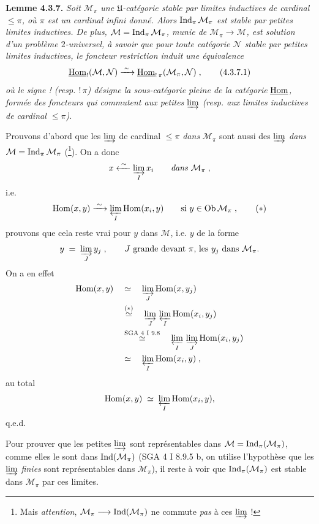 \textbf{Lemme 4.3.7.} \textit{Soit $\mathcal{M}_\pi$ une $\mathfrak{U}$-catégorie stable par limites inductives de cardinal $\leqslant \pi$, où $\pi$ est un cardinal infini donné. Alors} $\operatorname{Ind}_\pi\mathcal{M}_\pi$ \textit{est stable par petites limites inductives. De plus, $\mathcal{M} = \operatorname{Ind}_\pi\mathcal{M}_\pi$, munie de $\mathcal{M}_\pi \longrightarrow \mathcal{M}$, est solution d'un problème $2$-universel, à savoir
que pour toute catégorie $\mathcal{N}$ stable par petites limites inductives, le foncteur restriction induit une équivalence}
\[
\uHom_{!}(\mathcal{M},\mathcal{N}) \xrightarrow{\;\sim\;} \uHom_{!\,\pi}(\mathcal{M}_\pi,\mathcal{N}) \;, \tag*{(4.3.7.1)}
\]
\textit{où le signe ! (resp. $!\,\pi$) désigne la sous-catégorie pleine de la catégorie} $\underline{\mathrm{Hom}}$\textit{, formée des foncteurs qui commutent aux petites} $\varinjlim$ \textit{(resp. aux limites inductives de cardinal $\leqslant \pi$).}

Prouvons d'abord que les $\varinjlim$ de cardinal $\leqslant \pi$ \textit{dans} $\mathcal{M}_\pi$ sont aussi des $\varinjlim$ \textit{dans} $\mathcal{M} = \operatorname{Ind}_\pi\mathcal{M}_\pi$ (\footnote{Mais \textit{attention}, $\mathcal{M}_\pi \longrightarrow \operatorname{Ind}(\mathcal{M}_\pi)$ ne commute \textit{pas} à ces $\varinjlim$ !}). On a donc
\[
x \xleftarrow{\;\sim\;} \varinjlim_{I} x_i \qquad \textit{dans } \mathcal{M}_\pi \;,
\]
i.e.
\[
\Hom(x,y) \xrightarrow{\;\sim\;} \varprojlim_{I} \Hom(x_i,y) \qquad \text{si } y \in \Ob\mathcal{M}_\pi \;, \tag*{$(*)$}
\]
prouvons que cela reste vrai pour $y$ dans $\mathcal{M}$, i.e. $y$ de la forme
\[
y \;=\; \varinjlim_{J} y_j \;, \qquad J \text{ grande devant } \pi\text{, les } y_j \text{ dans } \mathcal{M}_\pi.
\]
On a en effet
\[
\begin{aligned}
\mathrm{Hom}(x,y) \quad &\simeq \quad \varinjlim_{J} \mathrm{Hom}(x,y_j)\\
&\overset{(*)}{\simeq} \quad \varinjlim_{J}\, \varprojlim_{I} \mathrm{Hom}(x_i,y_j)\\
&\overset{\text{SGA 4 I 9.8}}{\simeq} \quad \varprojlim_{I}\, \varinjlim_{J} \mathrm{Hom}(x_i,y_j)\\
&\simeq \quad \varprojlim_{I} \mathrm{Hom}(x_i,y) \;,
\end{aligned}
\]
au total
\[
\mathrm{Hom}(x,y) \;\simeq\; \varprojlim_{I} \mathrm{Hom}(x_i,y),
\]
q.e.d.

Pour prouver que les petites $\varinjlim$ sont représentables dans $\mathcal{M} = \operatorname{Ind}_\pi(\mathcal{M}_\pi)$, comme elles le sont dans $\operatorname{Ind}(\mathcal{M}_\pi)$ (SGA 4 I 8.9.5 b, on utilise l'hypothèse que les $\varinjlim$ \textit{finies} sont représentables dans $\mathcal{M}_\pi$), il reste à voir que $\operatorname{Ind}_\pi(\mathcal{M}_\pi)$ est stable dans $\mathcal{M}_\pi$ par ces limites.

